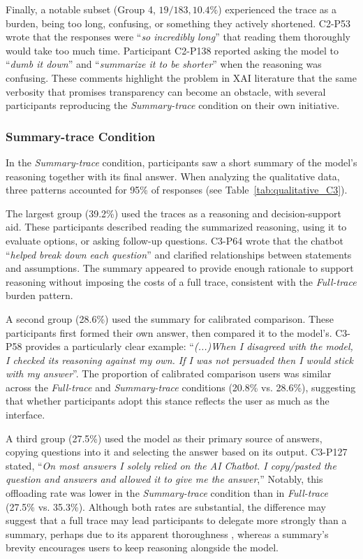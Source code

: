 \documentclass[manuscript, anonymous=false,authorversion,review=false]{acmart}
\begin{document}
Finally, a notable subset (Group 4, $19/183, 10.4\%$) experienced the trace as a burden, being too long, confusing, or something they actively shortened. C2-P53 wrote that the responses were ``\textit{so incredibly long}'' that reading them thoroughly would take too much time. Participant C2-P138 reported asking the model to ``\textit{dumb it down}'' and ``\textit{summarize it to be shorter}'' when the reasoning was confusing. These comments highlight the problem in XAI literature that the same verbosity that promises transparency can become an obstacle, with several participants reproducing the \textit{Summary-trace} condition on their own initiative.



\subsubsection{Summary-trace Condition}

In the \textit{Summary-trace} condition, participants saw a short summary of the model's reasoning together with its final answer. When analyzing the qualitative data, three patterns accounted for 95\% of responses (see Table~\ref{tab:qualitative_C3}).
 

The largest group (39.2\%) used the traces as a reasoning and decision-support aid. These participants described reading the summarized reasoning, using it to evaluate options, or asking follow-up questions. C3-P64 wrote that the chatbot ``\textit{helped break down each question}'' and clarified relationships between statements and assumptions. The summary appeared to provide enough rationale to support reasoning without imposing the costs of a full trace, consistent with the \textit{Full-trace} burden pattern.



A second group (28.6\%) used the summary for calibrated comparison. These participants first formed their own answer, then compared it to the model's. C3-P58 provides a particularly clear example: ``\textit{(...)When I disagreed with the model, I checked its reasoning against my own. If I was not persuaded then I would stick with my answer}''. The proportion of calibrated comparison users was similar across the \textit{Full-trace} and \textit{Summary-trace} conditions (20.8\% vs. 28.6\%), suggesting that whether participants adopt this stance reflects the user as much as the interface.


A third group (27.5\%) used the model as their primary source of answers, copying questions into it and selecting the answer based on its output. C3-P127 stated, ``\textit{On most answers I solely relied on the AI Chatbot. I copy/pasted the question and answers and allowed it to give me the answer},'' Notably, this offloading rate was lower in the \textit{Summary-trace} condition than in \textit{Full-trace} (27.5\% vs. 35.3\%). Although both rates are substantial, the difference may suggest that a full trace may lead participants to delegate more strongly than a summary, perhaps due to its apparent thoroughness \cite{10.1145/3397481.3450639, eiband2019impact}, whereas a summary's brevity encourages users to keep reasoning alongside the model.
\end{document}
